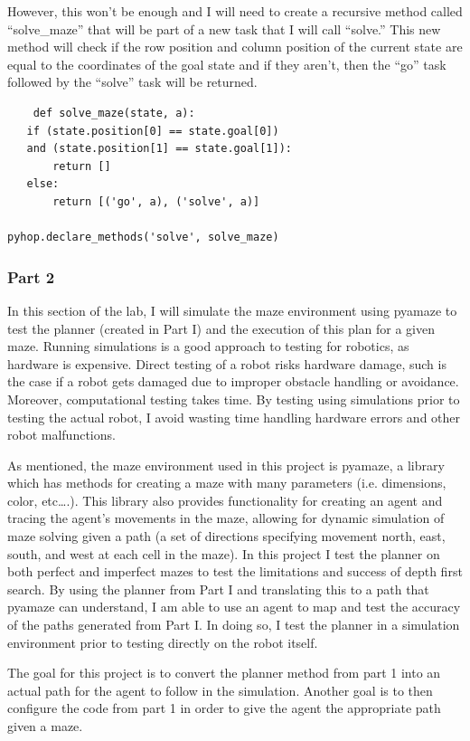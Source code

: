 \documentclass[10pt,twocolumn]{article}
\begin{document}
However, this won’t be enough and I will need to create a recursive method called “solve\_maze” that will be part of a new task that I will call “solve.” This new method will check if the row position and column position of the current state are  equal to the coordinates of the goal state and if they aren’t, then the “go” task followed by the “solve” task will be returned. 

\begin{verbatim}
    def solve_maze(state, a):
   if (state.position[0] == state.goal[0]) 
   and (state.position[1] == state.goal[1]):
       return []
   else:
       return [('go', a), ('solve', a)]

pyhop.declare_methods('solve', solve_maze)
\end{verbatim}

\subsubsection{Part 2}
In this section of the lab, I will simulate the maze environment using pyamaze to test the planner (created in Part I) and the execution of this plan for a given maze. Running simulations is a good approach to testing for robotics, as hardware is expensive. Direct testing of a robot risks hardware damage, such is the case if a robot gets damaged due to improper obstacle handling or avoidance. Moreover, computational testing takes time. By testing using simulations prior to testing the actual robot, I avoid wasting time handling hardware errors and other robot malfunctions.

As mentioned, the maze environment used in this project is pyamaze, a library which has methods for creating a maze with many parameters (i.e. dimensions, color, etc….). This library also provides functionality for creating an agent and tracing the agent’s movements in the maze, allowing for dynamic simulation of maze solving given a path (a set of directions specifying movement north, east, south, and west at each cell in the maze). In this project I test the planner on both perfect and imperfect mazes to test the limitations and success of depth first search. By using the planner from Part I and translating this to a path that pyamaze can understand, I am able to use an agent to map and test the accuracy of the paths generated from Part I. In doing so, I test the planner in a simulation environment prior to testing directly on the robot itself.

The goal for this project is to convert the planner method from part 1 into an actual path for the agent to follow in the simulation. Another goal is to then configure the code from part 1 in order to give the agent the appropriate path given a maze.
\end{document}
